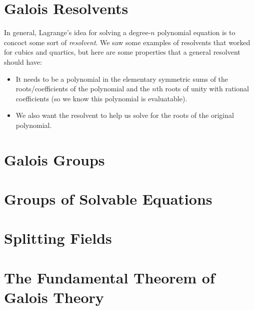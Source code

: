 \documentclass[12pt]{scrartcl}
\begin{document}
\section{Galois Resolvents}
In general, Lagrange's idea for solving a degree-$n$ polynomial equation is to concoct some sort of \textit{resolvent}. We saw some examples of resolvents that worked for cubics and quartics, but here are some properties that a general resolvent should have: 
\begin{itemize}
    \item It needs to be a polynomial in the elementary symmetric sums of the roots/coefficients of the polynomial and the $n$th roots of unity with rational coefficients (so we know this polynomial is evaluatable).
    \item We also want the resolvent to help us solve for the roots of the original polynomial.
\end{itemize}  

\section{Galois Groups}

\section{Groups of Solvable Equations}

\section{Splitting Fields}

\section{The Fundamental Theorem of Galois Theory}
\end{document}
